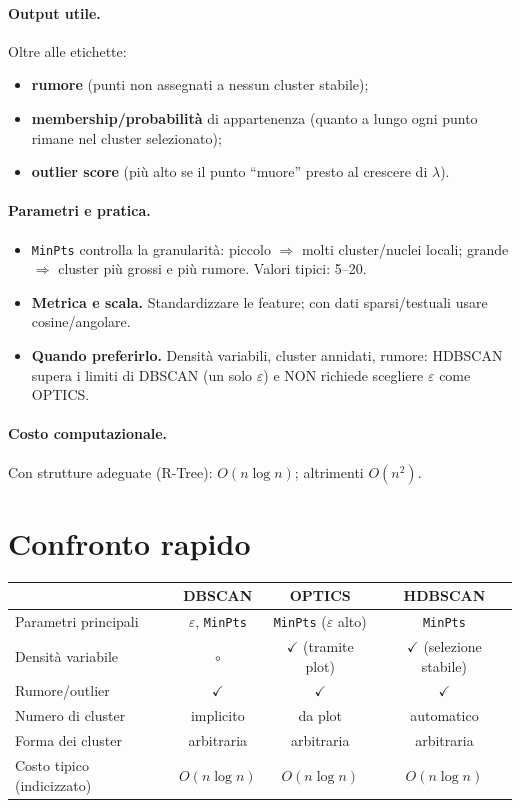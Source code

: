 \paragraph{Output utile.}
Oltre alle etichette:
\begin{itemize}
  \item \textbf{rumore} (punti non assegnati a nessun cluster stabile);
  \item \textbf{membership/probabilità} di appartenenza (quanto a lungo ogni punto rimane nel cluster selezionato);
  \item \textbf{outlier score} (più alto se il punto “muore” presto al crescere di \(\lambda\)).
\end{itemize}

\paragraph{Parametri e pratica.}
\begin{itemize}
  \item \texttt{MinPts} controlla la granularità: piccolo \(\Rightarrow\) molti cluster/nuclei locali; grande \(\Rightarrow\) cluster più grossi e più rumore. Valori tipici: 5–20.
  \item \textbf{Metrica e scala.} Standardizzare le feature; con dati sparsi/testuali usare cosine/angolare.
  \item \textbf{Quando preferirlo.} Densità variabili, cluster annidati, rumore: HDBSCAN supera i limiti di DBSCAN (un solo \(\varepsilon\)) e NON richiede scegliere \(\varepsilon\) come OPTICS.
\end{itemize}

\paragraph{Costo computazionale.} Con strutture adeguate (R-Tree): \(O(n\log n)\); altrimenti \(O(n^2)\).

\section{Confronto rapido}\label{sec:confronto-densita}
\begin{center}
  \begin{tabular}{@{}lccc@{}}
  \toprule
  & \textbf{DBSCAN} & \textbf{OPTICS} & \textbf{HDBSCAN} \\
  \midrule
  Parametri principali & $\varepsilon$, \texttt{MinPts} & \texttt{MinPts} ($\varepsilon$ alto) & \texttt{MinPts} \\
  Densità variabile & \(\circ\) & \(\checkmark\) (tramite plot) & \(\checkmark\) (selezione stabile) \\
  Rumore/outlier & \(\checkmark\) & \(\checkmark\) & \(\checkmark\) \\
  Numero di cluster & implicito & da plot & automatico \\
  Forma dei cluster & arbitraria & arbitraria & arbitraria \\
  Costo tipico (indicizzato) & $O(n\log n)$ & $O(n\log n)$ & $O(n\log n)$ \\
  \bottomrule
  \end{tabular}
\end{center}
